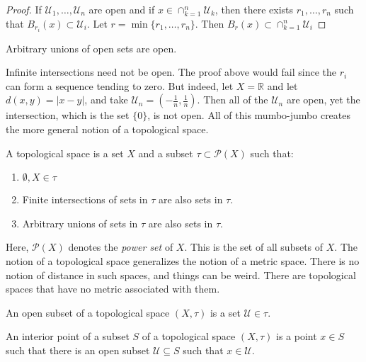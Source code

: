     \begin{proof}
        If $\mathcal{U}_{1},\hdots,\mathcal{U}_{n}$
        are open and if
        $x\in\cap_{k=1}^{n}\mathcal{U}_{k}$, then there
        exists $r_{1},\hdots,r_{n}$ such that
        $B_{r_{i}}(x)\subset\mathcal{U}_{i}$. Let
        $r=\min\{r_{1},\hdots,r_{n}\}$. Then
        $B_{r}(x)\subset\cap_{k=1}^{n}\mathcal{U}_{i}$
    \end{proof}
    \begin{theorem}
        Arbitrary unions of open sets are open.
    \end{theorem}
    Infinite intersections need not be open.
    The proof above would fail since the
    $r_{i}$ can form a sequence tending to zero.
    But indeed, let $X=\mathbb{R}$ and let
    $d(x,y)=|x-y|$, and take
    $\mathcal{U}_{n}=(-\frac{1}{n},\frac{1}{n})$.
    Then all of the $\mathcal{U}_{n}$ are open,
    yet the intersection, which is the set $\{0\}$,
    is not open. All of this mumbo-jumbo creates
    the more general notion of a topological space.
    \begin{definition}
        A topological space is a set $X$ and a
        subset $\tau\subset\mathcal{P}(X)$ such that:
        \begin{enumerate}
            \item $\emptyset,X\in\tau$
            \item Finite intersections of sets in $\tau$
                  are also sets in $\tau$.
            \item Arbitrary unions of sets in $\tau$
                  are also sets in $\tau$.
        \end{enumerate}
    \end{definition}
    Here, $\mathcal{P}(X)$ denotes the \textit{power set}
    of $X$. This is the set of all subsets of $X$.
    The notion of a topological space generalizes the
    notion of a metric space. There is no notion of
    distance in such spaces, and things can be weird.
    There are topological spaces that have no metric
    associated with them.
    \begin{definition}
        An open subset of a topological space
        $(X,\tau)$ is a set $\mathcal{U}\in\tau$.
    \end{definition}
    \begin{definition}
        An interior point of a subset $S$ of a topological
        space $(X,\tau)$ is a point $x\in{S}$ such that
        there is an open subset $\mathcal{U}\subseteq{S}$
        such that $x\in\mathcal{U}$.
    \end{definition}
